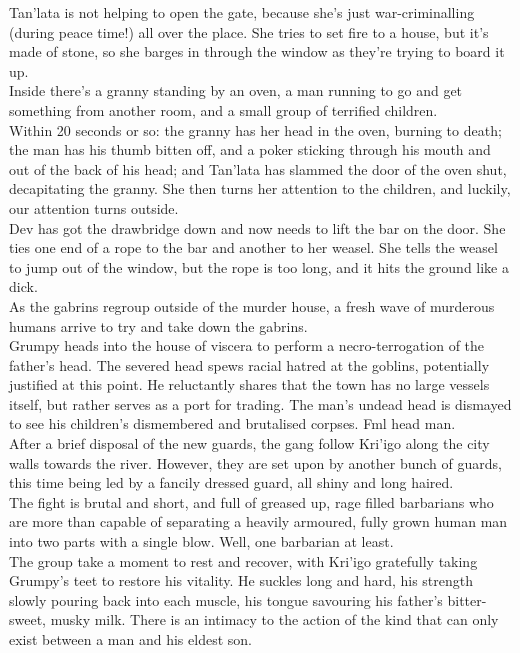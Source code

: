 Tan’lata is not helping to open the gate, because she’s just war-criminalling (during peace time!) all over the place. She tries to set fire to a house, but it’s made of stone, so she barges in through the window as they’re trying to board it up.\\
Inside there's a granny standing by an oven, a man running to go and get something from another room, and a small group of terrified children.\\
Within 20 seconds or so: the granny has her head in the oven, burning to death; the man has his thumb bitten off, and a poker sticking through his mouth and out of the back of his head; and Tan’lata has slammed the door of the oven shut, decapitating the granny. She then turns her attention to the children, and luckily, our attention turns outside.\\
Dev has got the drawbridge down and now needs to lift the bar on the door. She ties one end of a rope to the bar and another to her weasel. She tells the weasel to jump out of the window, but the rope is too long, and it hits the ground like a dick.\\
As the gabrins regroup outside of the murder house, a fresh wave of murderous humans arrive to try and take down the gabrins.\\
Grumpy heads into the house of viscera to perform a necro-terrogation of the father’s head. The severed head spews racial hatred at the goblins, potentially justified at this point. He reluctantly shares that the town has no large vessels itself, but rather serves as a port for trading. The man’s undead head is dismayed to see his children’s dismembered and brutalised corpses. Fml head man.\\
After a brief disposal of the new guards, the gang follow Kri'igo along the city walls towards the river. However, they are set upon by another bunch of guards, this time being led by a fancily dressed guard, all shiny and long haired.\\
The fight is brutal and short, and full of greased up, rage filled barbarians who are more than capable of separating a heavily armoured, fully grown human man into two parts with a single blow. Well, one barbarian at least.\\
The group take a moment to rest and recover, with Kri'igo gratefully taking Grumpy’s teet to restore his vitality. He suckles long and hard, his strength slowly pouring back into each muscle, his tongue savouring his father’s bitter-sweet, musky milk. There is an intimacy to the action of the kind that can only exist between a man and his eldest son.\\
